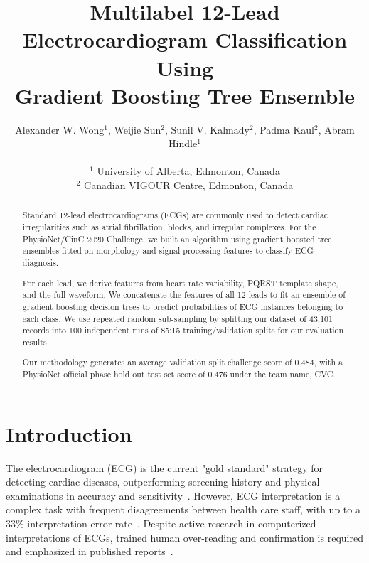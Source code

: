 \documentclass[twocolumn]{cinc}
\begin{document}


\title{Multilabel 12-Lead Electrocardiogram Classification Using \\
Gradient Boosting Tree Ensemble}

\author {Alexander W. Wong$^{1}$, Weijie Sun$^{2}$, Sunil V. Kalmady$^{2}$, Padma Kaul$^{2}$, Abram Hindle$^{1}$\\
\ \\
 $^1$ University of Alberta, Edmonton, Canada \\
$^2$ Canadian VIGOUR Centre, Edmonton, Canada }

\maketitle

\newcommand{\officialscore}{{0.476} }

\begin{abstract}

Standard 12-lead electrocardiograms (ECGs) are commonly used to detect cardiac irregularities such as atrial fibrillation, blocks, and irregular complexes.
For the PhysioNet/CinC 2020 Challenge, we built an algorithm using gradient boosted tree ensembles fitted on morphology and signal processing features to classify ECG diagnosis.

For each lead, we derive features from heart rate variability, PQRST template shape, and the full waveform.
We concatenate the features of all 12 leads to fit an ensemble of gradient boosting decision trees to predict probabilities of ECG instances belonging to each class.
We use repeated random sub-sampling by splitting our dataset of 43,101 records into 100 independent runs of 85:15 training/validation splits for our evaluation results.

Our methodology generates an average validation split challenge score of 0.484, with a PhysioNet official phase hold out test set score of \officialscore under the team name, CVC.

\end{abstract}

\section{Introduction}

The electrocardiogram (ECG) is the current "gold standard" strategy for detecting cardiac diseases, outperforming screening history and physical examinations in accuracy and sensitivity~\cite{harmon_effectiveness_2015}.
However, ECG interpretation is a complex task with frequent disagreements between health care staff, with up to a 33\% interpretation error rate~\cite{mele_improving_2008}.
Despite active research in computerized interpretations of ECGs, trained human over-reading and confirmation is required and emphasized in published reports~\cite{schlapfer_computer-interpreted_2017}.
\end{document}

